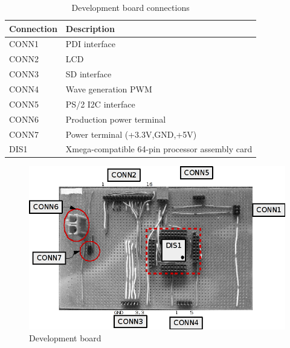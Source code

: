 \documentclass[bibtotocnumbered,abstract=on,paper=a4,fontsize=12pt,parskip=on,halfparskip=on]{scrartcl}		%
\begin{document}
\begin{enumerate}
    \begin{table}[H]
    \caption{Development board connections}
    \vskip 0.3cm
    \small
    \center
    \begin{tabularx}{0.8\textwidth}{  l X }
      \textbf{Connection} & \textbf{Description}\\
      \hline
      CONN1 & PDI interface\\
      CONN2 & LCD\\
      CONN3 & SD interface\\
      CONN4 & Wave generation PWM\\
      CONN5 & PS/2 I2C interface\\
      CONN6 & Production power terminal\\
      CONN7 & Power terminal (+3.3V,GND,+5V)\\
      DIS1 & Xmega-compatible 64-pin processor assembly card\\
    \end{tabularx}
    \end{table}
  \begin{figure}[H]
    \centering
      \includegraphics[width=\linewidth]{img/testdoc_board}
      \caption{Development board}
  \end{figure}
\end{enumerate}
\clearpage
\end{document}
